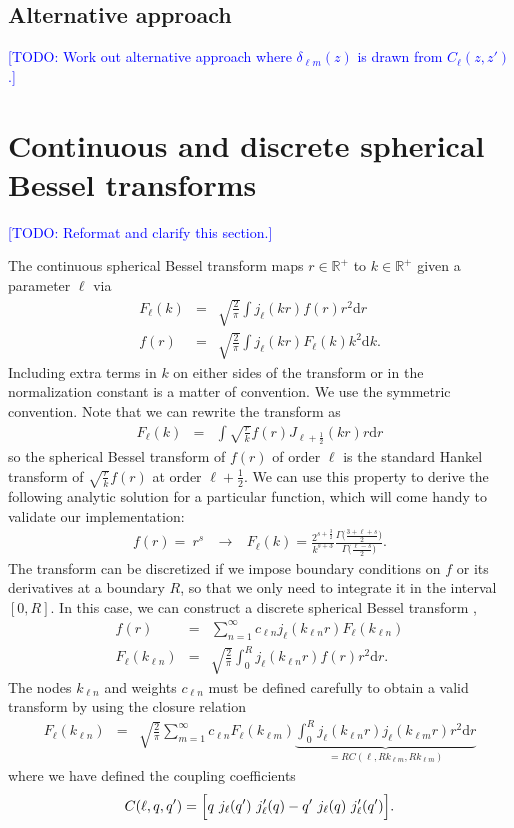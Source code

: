 \documentclass{aastex6}
\renewcommand{\d}{{\mathrm{d}}}
\newcommand{\eqn}[1]{\begin{eqnarray}#1\end{eqnarray}}
\newcommand{\todo}[1]{\textcolor{blue}{[TODO: #1]}}
\begin{document}
\subsection{Alternative approach}

\todo{Work out alternative approach where $\delta_{\ell m}(z)$ is drawn from $C_\ell(z, z')$.}

\newpage
\appendix
\section{Continuous and discrete spherical Bessel transforms}

\todo{Reformat and clarify this section.}

The continuous spherical Bessel transform maps $r\in\mathbb{R}^+$ to $k\in\mathbb{R}^+$ given a parameter $\ell$ via
\eqn{
	F_\ell(k)  &=& \sqrt{\frac{2}{\pi}} \int   j_\ell(k r) f(r) r^2 \d r  \\
	f(r) &=& \sqrt{\frac{2}{\pi}} \int   j_\ell(k r) F_\ell(k) k^2 \d k.
}
Including extra terms in $k$ on either sides of the transform or in the normalization constant is a matter of convention. We use the symmetric convention. Note that we can rewrite the transform as
\eqn{
	F_\ell(k) &=& \int  \sqrt{\frac{r}{k}}f(r)  J_{\ell+\frac{1}{2}}(k r)  r \d r
}
so the spherical Bessel transform of $f(r)$ of order $\ell$ is the standard Hankel transform of $ \sqrt{\frac{r}{k}}f(r)$ at order $\ell+\frac{1}{2}$.
We can use this property to derive the following analytic solution for a particular function, which will come handy to validate our implementation:
\eqn{
	f(r)= \ r^{s}  &\ \longrightarrow \ &		F_\ell(k) = \frac{2^{s+\frac{3}{2}}}{k^{s+3}} \frac{\Gamma\bigl(\frac{3+\ell+s}{2}\bigr)}{\Gamma\bigl(\frac{\ell-s}{2}\bigr)}.
}
The transform can  be discretized if we impose boundary conditions on $f$ or its derivatives at a boundary $R$, so that we only need to integrate it in the interval $[0, R]$. In this case, we can construct a discrete spherical Bessel transform \citep{Fisher1994},
\eqn{ 
	f(r) &=& \sum_{n=1}^\infty  c_{\ell n}  j_\ell(k_{\ell n} r) F_\ell(k_{\ell n}) \\
	F_\ell(k_{\ell n}) &=& \sqrt{\frac{2}{\pi}} \int_0^R  j_\ell(k_{\ell n} r) f(r) r^2 \d r .
}
The nodes $k_{\ell n}$ and weights $c_{\ell n}$ must be defined carefully to obtain a valid transform by using the closure relation
\eqn{
	F_\ell(k_{\ell n}) &=& \sqrt{\frac{2}{\pi}}  \sum_{m=1}^\infty c_{\ell n}F_\ell(k_{\ell m})  \underbrace{\int_0^R j_\ell(k_{\ell n} r)  j_\ell(k_{\ell m} r) r^2 \d r}_{ = R  C(\ell, Rk_{\ell m}, Rk_{\ell m})}
}	
where we have defined the coupling coefficients
\eqn{
	 C(\ell, q, q^\prime)= \Bigl[ q \ j_\ell( q^\prime ) \ j^\prime_\ell( q ) - q^\prime \ j_\ell( q) \ j^\prime_\ell( q^\prime )    \Bigr].
}
\end{document}

